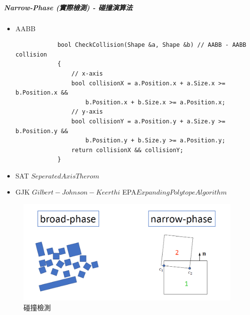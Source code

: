 \subparagraph{Narrow-Phase (實際檢測) - 碰撞演算法}
\begin{itemize}
    \item{AABB}
        \begin{lstlisting}
            bool CheckCollision(Shape &a, Shape &b) // AABB - AABB collision
            {
                // x-axis
                bool collisionX = a.Position.x + a.Size.x >= b.Position.x &&
                    b.Position.x + b.Size.x >= a.Position.x;
                // y-axis
                bool collisionY = a.Position.y + a.Size.y >= b.Position.y &&
                    b.Position.y + b.Size.y >= a.Position.y;
                return collisionX && collisionY;
            }  
        \end{lstlisting}
    \item{SAT \(Seperated Axis Therom\)}
    \item{GJK \(Gilbert-Johnson-Keerthi\) EPA\(Expanding Polytope Algorithm\)}
\end{itemize}

\begin{figure}[h]
    \includegraphics[width=0.8\linewidth]{./resources/physics/detection.png}
\caption{碰撞檢測}
\label{fig:phy_detection}
\end{figure}

